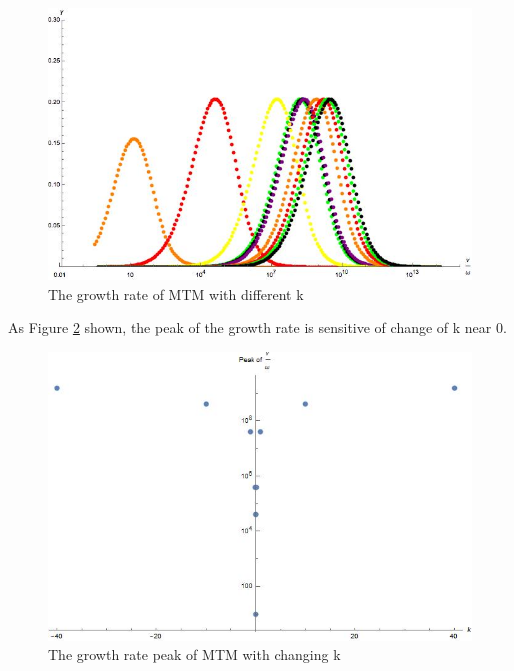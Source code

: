 \begin{figure}[h] \centering
        \includegraphics[width=1\textwidth]{Image/k_diff.jpeg}
        \caption{The growth rate of MTM with different k}
        \label{fig:k_diff}
\end{figure}

As Figure \ref{fig:k_peak} shown, the peak of the growth rate is sensitive of change of k near 0.

\begin{figure}[h] \centering
        \includegraphics[width=1\textwidth]{Image/k_peak.jpg}
        \caption{The growth rate peak of MTM with changing k}
        \label{fig:k_peak}
\end{figure}
